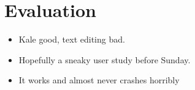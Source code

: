 \chapter{Evaluation}

\begin{itemize}[noitemsep]
	\item Kale good, text editing bad.
	\item Hopefully a sneaky user study before Sunday.
	\item It works and almost never crashes horribly
\end{itemize}